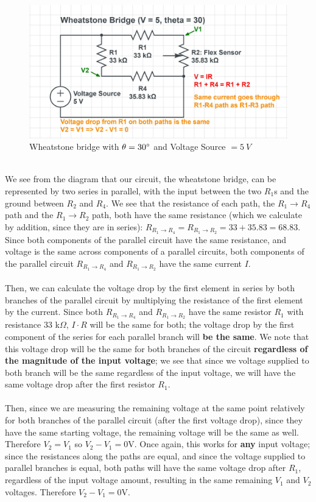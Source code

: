 \documentclass[12pt, a4paper]{article}
\begin{document}
\begin{enumerate}
\begin{figure}[h]
\centering
\includegraphics[width=1\textwidth]{inprogress3}
\caption{Wheatstone bridge with $\theta = 30 \degree$ and Voltage Source $ = 5 \ V$}
\end{figure}
\\We see from the diagram that our circuit, the wheatstone bridge, can be represented by two series in parallel, with the input between the two $R_1$s and the ground between $R_2$ and $R_4$. We see that the resistance of each path, the $R_1\to R_4$ path and the $R_1\to R_2$ path, both have the same resistance (which we calculate by addition, since they are in series): $R_{R_1\to R_4} = R_{R_1\to R_2} = 33 + 35.83 = 68.83$. Since both components of the parallel circuit have the same resistance, and voltage is the same across components of a parallel circuits, both components of the parallel circuit  $R_{R_1\to R_4}$ and $R_{R_1\to R_2}$ have the same current $I$.\\ \\
Then, we can calculate the voltage drop by the first element in series by both branches of the parallel circuit by multiplying the resistance of the first element by the current. Since both   $R_{R_1\to R_4}$ and $R_{R_1\to R_2}$ have the same resistor $R_1$ with resistance 33 k$\Omega$, $I \cdot R$ will be the same for both; the voltage drop by the first component of the series for each parallel branch will \textbf{be the same}. We note that this voltage drop will be the same for both branches of the circuit \textbf{regardless of the magnitude of the input voltage}; we see that since we voltage supplied to both branch will be the same regardless of the input voltage, we will have the same voltage drop after the first resistor $R_1$. \\ \\
Then, since we are measuring the remaining voltage at the same point relatively for both branches of the parallel circuit (after the first voltage drop), since they have the same starting voltage, the remaining voltage will be the same as well. Therefore $V_2 = V_1$ so $V_2 - V_1 = 0$V. Once again, this works for \textbf{any} input voltage; since the resistances along the paths are equal, and since the voltage supplied to parallel branches is equal, both paths will have the same voltage drop after $R_1$, regardless of the input voltage amount, resulting in the same remaining $V_1$ and $V_2$ voltages. Therefore $V_2 - V_1 = 0$V.

\end{enumerate}
\pagebreak
\end{document}
